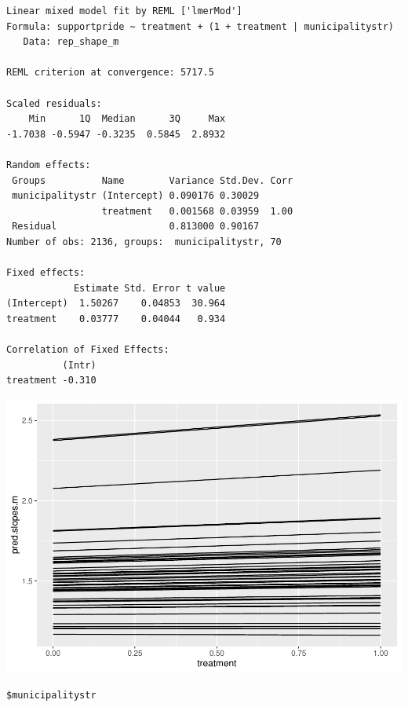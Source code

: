 \documentclass[
]{article}
\begin{document}
\begin{verbatim}
Linear mixed model fit by REML ['lmerMod']
Formula: supportpride ~ treatment + (1 + treatment | municipalitystr)
   Data: rep_shape_m

REML criterion at convergence: 5717.5

Scaled residuals: 
    Min      1Q  Median      3Q     Max 
-1.7038 -0.5947 -0.3235  0.5845  2.8932 

Random effects:
 Groups          Name        Variance Std.Dev. Corr
 municipalitystr (Intercept) 0.090176 0.30029      
                 treatment   0.001568 0.03959  1.00
 Residual                    0.813000 0.90167      
Number of obs: 2136, groups:  municipalitystr, 70

Fixed effects:
            Estimate Std. Error t value
(Intercept)  1.50267    0.04853  30.964
treatment    0.03777    0.04044   0.934

Correlation of Fixed Effects:
          (Intr)
treatment -0.310
\end{verbatim}

\includegraphics{SMI205_Assessment2_Template_files/figure-latex/random slopes plots-1.pdf}

\begin{verbatim}
$municipalitystr
\end{verbatim}
\end{document}
